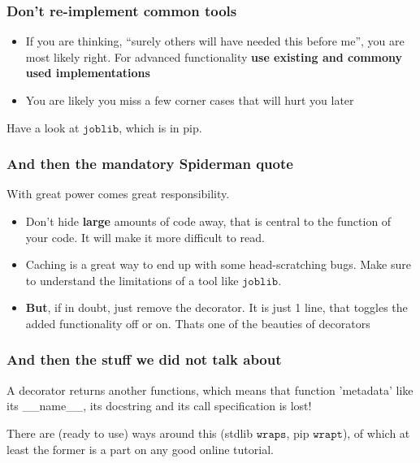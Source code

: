 \documentclass{beamer}
\begin{document}
\begin{frame}
  \frametitle{Don't re-implement common tools}
  \begin{itemize}
  \item If you are thinking, ``surely others will have needed this before me'',
    you are most likely right. For advanced functionality \textbf{use existing and commony used implementations}
  \item You are likely you miss a few corner cases that will hurt you later
  \end{itemize}
  \begin{block}{}
    Have a look at $\texttt{joblib}$, which is in pip.
  \end{block}
\end{frame}

\begin{frame}
  \frametitle{And then the mandatory Spiderman quote}
  \begin{block}{}
    With great power comes great responsibility.
  \end{block}
  \begin{itemize}
  \item Don't hide \textbf{large} amounts of code away, that is central to the
    function of your code. It will make it more difficult to read.
  \item Caching is a great way to end up with some head-scratching bugs. Make
    sure to understand the limitations of a tool like $\texttt{joblib}$.
  \item \textbf{But}, if in doubt, just remove the decorator. It is just 1
    line, that toggles the added functionality off or on. Thats one of the
    beauties of decorators
  \end{itemize}
\end{frame}

\begin{frame}
  \frametitle{And then the stuff we did not talk about}
  \begin{block}{}
    A decorator returns another functions, which means that function
    'metadata' like its __name__, its docstring and its call specification is
    lost!
  \end{block}
  There are (ready to use) ways around this (stdlib $\texttt{wraps}$, pip
  $\texttt{wrapt}$), of which at least the former is a part on any good online
  tutorial.
\end{frame}
\end{document}
